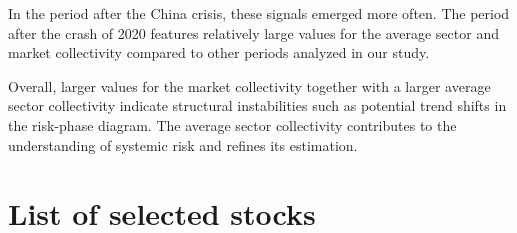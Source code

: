 \documentclass[aps, pra, groupedaddress, showkeys, twocolumn, floatfix, 10pt]{revtex4-2}
\begin{document}
In the period after the China crisis, these signals emerged more often.
The period after the crash of 2020 features relatively large values for the average sector and market collectivity compared to other periods analyzed in our study.

Overall, larger values for the market collectivity together with a larger average sector collectivity indicate
structural instabilities such as potential trend shifts in the risk-phase diagram. 
The average sector collectivity contributes to the understanding of systemic risk and refines its estimation.



\clearpage


\appendix


\clearpage
\onecolumngrid
\section{\label{sec:ListStocks}List of selected stocks}
\end{document}
